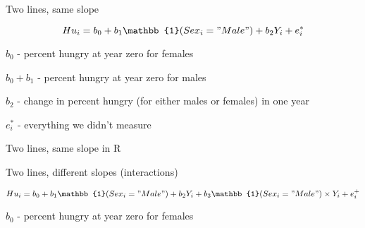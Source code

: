 \documentclass[12pt,]{04-class-files/abntex2}
\newenvironment{Shaded}{\begin{snugshade}}{\end{snugshade}}
\newcommand{\DataTypeTok}[1]{\textcolor[rgb]{0.13,0.29,0.53}{#1}}
\newcommand{\DecValTok}[1]{\textcolor[rgb]{0.00,0.00,0.81}{#1}}
\newcommand{\KeywordTok}[1]{\textcolor[rgb]{0.13,0.29,0.53}{\textbf{#1}}}
\newcommand{\NormalTok}[1]{#1}
\newcommand{\OperatorTok}[1]{\textcolor[rgb]{0.81,0.36,0.00}{\textbf{#1}}}
\newcommand{\StringTok}[1]{\textcolor[rgb]{0.31,0.60,0.02}{#1}}
\begin{document}
Two lines, same slope

\[Hu_i = b_0 + b_1 \mathbb{1}(Sex_i="Male") + b_2 Y_i + e^*_i\]

\(b_0\) - percent hungry at year zero for females

\(b_0 + b_1\) - percent hungry at year zero for males

\(b_2\) - change in percent hungry (for either males or females) in one year

\(e^*_i\) - everything we didn't measure

Two lines, same slope in R

\begin{Shaded}
\end{Shaded}

Two lines, different slopes (interactions)

\[Hu_i = b_0 + b_1 \mathbb{1}(Sex_i="Male") + b_2 Y_i + b_3 \mathbb{1}(Sex_i="Male")\times Y_i + e^+_i\]

\(b_0\) - percent hungry at year zero for females
\end{document}
